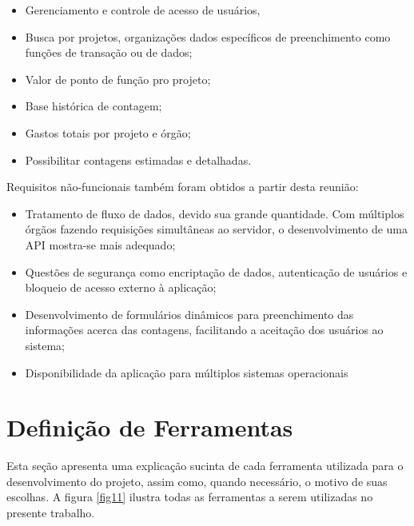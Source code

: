 \begin{itemize}

  \item Gerenciamento e controle de acesso de usuários,

  \item Busca por projetos, organizações  dados específicos de preenchimento
  como funções de transação ou de dados;

  \item Valor de ponto de função pro projeto;

  \item Base histórica de contagem;

  \item Gastos totais por projeto e órgão;

  \item Possibilitar contagens estimadas e detalhadas.

\end{itemize}

Requisitos não-funcionais também foram obtidos a partir desta reunião:

\begin{itemize}

  \item Tratamento de fluxo de dados, devido sua grande quantidade. Com múltiplos órgãos fazendo requisições simultâneas ao servidor, o desenvolvimento de uma API mostra-se mais adequado;

  \item Questões de segurança como encriptação de dados, autenticação de usuários e bloqueio de acesso externo à aplicação;

  \item Desenvolvimento de formulários dinâmicos para preenchimento das informações acerca das contagens, facilitando a aceitação dos usuários ao sistema;

  \item Disponibilidade da aplicação para múltiplos sistemas operacionais

\end{itemize}

\section{Definição de Ferramentas}

Esta seção apresenta uma explicação sucinta de cada ferramenta utilizada para o desenvolvimento do projeto, assim como, quando necessário, o motivo de suas escolhas. A figura \ref{fig11} ilustra todas as ferramentas a serem utilizadas no presente trabalho.

